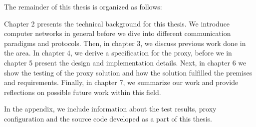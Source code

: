 The remainder of this thesis is organized as follows:

Chapter 2 presents the technical background for this thesis. We introduce
computer networks in general before we dive into different communication
paradigms and protocols. Then, in chapter 3, we discuss previous work done in
the area. In chapter 4, we derive a specification for the proxy, before we in
chapter 5 present the design and implementation details. Next, in chapter 6 we
show the testing of the proxy solution and how the solution fulfilled the
premises and requirements. Finally, in chapter 7, we summarize our work and
provide reflections on possible future work within this field.

In the appendix, we include information about the test results, proxy
configuration and the source code developed as a part of this thesis.
